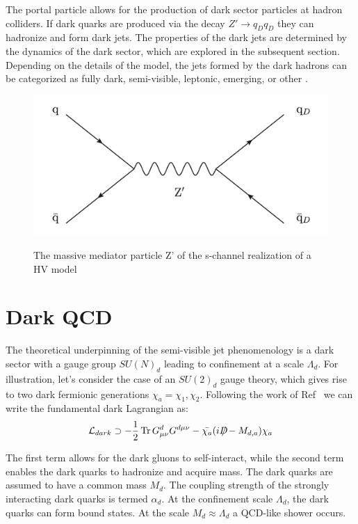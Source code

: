 The portal particle allows for the production of dark sector particles at hadron colliders. If dark quarks are produced via the decay $Z' \rightarrow q_D q_D$ they can hadronize and form dark jets. The properties of the dark jets are determined by the dynamics of the dark sector, which are explored in the subsequent section. Depending on the details of the model, the jets formed by the dark hadrons can be categorized as fully dark, semi-visible, leptonic, emerging, or other \cite{snowmass}. \par

\begin{figure}[h]
        \centering
	\includegraphics[width=.5\textwidth]{figures/ch2/zprime_feynman_diagram.png}
        \label{fig:ch2/zprime_feynman_diagram.png}
        \caption{The massive mediator particle Z' of the s-channel realization of a HV model}
\end{figure}

\section{Dark QCD}
\label{sec:darkqcd}
The theoretical underpinning of the semi-visible jet phenomenology is a dark sector with a gauge group $SU(N)_d$ leading to confinement at a scale $\Lambda_d$. For illustration, let's consider the case of an $SU(2)_d$ gauge theory, which gives rise to two dark fermionic generations $\chi_a = \chi_1, \chi_2$. Following the work of Ref~\cite{darkqcd} we can write the fundamental dark Lagrangian as:
\begin{equation}
	\mathcal{L}_{dark} \supset - \frac{1}{2} \Tr G^{d}_{\mu\nu} G^{d\mu\nu} - \bar{\chi_a} (i {D\mkern-11.5mu/}-M_{d,a}) \chi_a
\end{equation}

The first term allows for the dark gluons to self-interact, while the second term enables the dark quarks to hadronize and acquire mass. The dark quarks are assumed to have a common mass $M_d$. The coupling strength of the strongly interacting dark quarks is termed $\alpha_d$. At the confinement scale $\Lambda_d$, the dark quarks can form bound states. At the scale $M_d \approx \Lambda_d$ a QCD-like shower occurs. \par 

